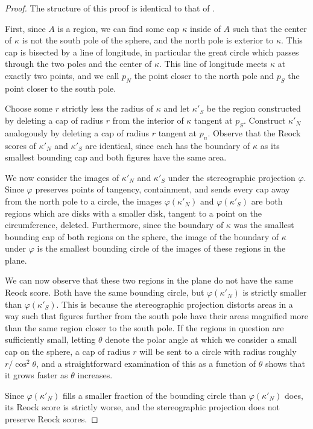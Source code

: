 \begin{proof}

  The structure of this proof is identical to that of
  .

  First, since $A$ is a region, we can find some cap $\kappa$ inside
  of $A$ such that the center of $\kappa$ is not the south pole of the
  sphere, and the north pole is exterior to $\kappa$.  This cap is
  bisected by a line of longitude, in particular the great circle
  which passes through the two poles and the center of $\kappa$.  This
  line of longitude meets $\kappa$ at exactly two points, and we call
  $p_N$ the point closer to the north pole and $p_S$ the point closer
  to the south pole.

  Choose some $r$ strictly less the radius of $\kappa$ and let
  $\kappa'_S$ be the region constructed by deleting a cap of radius
  $r$ from the interior of $\kappa$ tangent at $p_S$.  Construct
  $\kappa'_N$ analogously by deleting a cap of radius $r$ tangent at
  $p_n$. Observe that the Reock scores of $\kappa'_N$ and $\kappa'_S$
  are identical, since each has the boundary of $\kappa$ as its
  smallest bounding cap and both figures have the same area.

  We now consider the images of $\kappa'_N$ and $\kappa'_S$ under the
  stereographic projection $\varphi$.  Since $\varphi$ preserves
  points of tangency, containment, and sends every cap away from the
  north pole to a circle, the images $\varphi(\kappa'_N)$ and
  $\varphi(\kappa'_S)$ are both regions which are disks with a smaller
  disk, tangent to a point on the circumference, deleted.
  Furthermore, since the boundary of $\kappa$ was the smallest
  bounding cap of both regions on the sphere, the image of the
  boundary of $\kappa$ under $\varphi$ is the smallest bounding circle
  of the images of these regions in the plane.

  We can now observe that these two regions in the plane do not have
  the same Reock score.  Both have the same bounding circle, but
  $\varphi(\kappa'_N)$ is strictly smaller than $\varphi(\kappa'_S)$.
  This is because the stereographic projection distorts areas in a way
  such that figures further from the south pole have their areas
  magnified more than the same region closer to the south pole.  If
  the regions in question are sufficiently small, letting $\theta$
  denote the polar angle at which we consider a small cap on the
  sphere, a cap of radius $r$ will be sent to a circle with radius
  roughly $r/\cos^2{\theta}$, and a straightforward
  examination of this as a function of $\theta$ shows that it grows
  faster as $\theta$ increases.

  Since $\varphi(\kappa'_N)$ fills a smaller fraction of the bounding
  circle than $\varphi(\kappa'_N)$ does, its Reock score is strictly
  worse, and the stereographic projection does not preserve Reock
  scores.
\end{proof}

